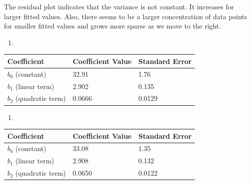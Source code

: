\documentclass{article}
\begin{document}
The residual plot indicates that the variance is not constant. It
increases for larger fitted values. Also, there seems to be a larger
concentration of data points for smaller fitted values and grows more
sparse as we move to the right.

\begin{enumerate}
\def\labelenumi{\alph{enumi})}
\setcounter{enumi}{2}
\item
\end{enumerate}

\begin{longtable}[c]{@{}lll@{}}
\toprule
Coefficient & Coefficient Value & Standard Error\tabularnewline
\midrule
\endhead
\(b_0\) (constant) & 32.91 & 1.76\tabularnewline
\(b_1\) (linear term) & 2.902 & 0.135\tabularnewline
\(b_2\) (quadratic term) & 0.0666 & 0.0129\tabularnewline
\bottomrule
\end{longtable}

\begin{enumerate}
\def\labelenumi{\alph{enumi})}
\setcounter{enumi}{3}
\item
\end{enumerate}

\begin{longtable}[c]{@{}lll@{}}
\toprule
Coefficient & Coefficient Value & Standard Error\tabularnewline
\midrule
\endhead
\(b_0\) (constant) & 33.08 & 1.35\tabularnewline
\(b_1\) (linear term) & 2.908 & 0.132\tabularnewline
\(b_2\) (quadratic term) & 0.0650 & 0.0122\tabularnewline
\bottomrule
\end{longtable}
\end{document}
